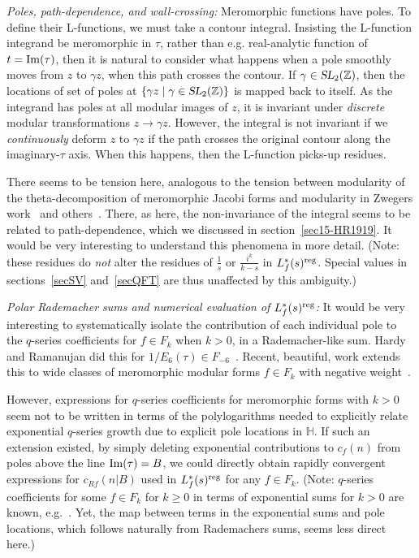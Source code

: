 \documentclass[11pt,a4paper]{article}
\newcommand{\g}{\gamma}
\def\Z{\mathbb{Z}}
\newcommand{\SL}{\operatorname{\textsl{SL}}}	 	%
\newcommand{\HH}{{\mathbb H}}				%
\newcommand{\reg}{{\rm reg}}
\begin{document}
{\em Poles, path-dependence, and wall-crossing:} Meromorphic functions have poles. To define their L-functions, we must take a contour integral. Insisting the L-function integrand be meromorphic in $\tau$, rather than e.g. real-analytic function of $t = {\rm Im}(\tau)$, then it is natural to consider what happens when a pole smoothly moves from $z$ to $\g z$, when this path crosses the contour. If $\g \in \SL_2(\Z)$, then the locations of set of poles at $\{\g z \mid \g \in \SL_2(\Z)\}$ is mapped back to itself. As the integrand has poles at all modular images of $z$, it is invariant under {\em discrete} modular transformations $z \to \g z$. However, the integral is not invariant if we {\em continuously} deform $z$ to $\g z$ if the path crosses the original contour along the imaginary-$\tau$ axis. When this happens, then the L-function picks-up residues. 

There seems to be tension here, analogous to the tension between modularity of the theta-decomposition of meromorphic Jacobi forms and modularity in Zwegers work~\cite{23-Zwegers} and others~\cite{24-DMZ}. There, as here, the non-invariance of the integral seems to be related to path-dependence, which we discussed in section~\ref{sec15-HR1919}. It would be very interesting to understand this phenomena in more detail. (Note: these residues do {\em not} alter the residues of $\tfrac1s$ or $\tfrac{i^k}{k-s}$ in $L_f^*(s)^\reg$. Special values in sections~\ref{secSV} and~\ref{secQFT} are thus unaffected by this ambiguity.)

{\em Polar Rademacher sums and numerical evaluation of $L_f^*(s)^\reg$:} It would be very interesting to systematically isolate the contribution of each individual pole to the $q$-series coefficients for $f \in F_k$ when $k > 0$, in a Rademacher-like sum. Hardy and Ramanujan did this for $1/E_6(\tau) \in F_{-6}$~\cite{15-HR1919}. Recent, beautiful, work extends this to wide classes of meromorphic modular forms $f \in F_{k}$ with negative weight~\cite{16-BialekPol1, 17-BialekPol2, 18-BialekPol3, 19-KolnPol1, 20-KolnPol2}. 

However, expressions for $q$-series coefficients for meromorphic forms with $k > 0$ seem not to be written in terms of the polylogarithms needed to explicitly relate exponential $q$-series growth due to explicit pole locations in $\HH$. If such an extension existed, by simply deleting exponential contributions to $c_f(n)$ from poles above the line ${\rm Im}(\tau) = B$, we could directly obtain rapidly convergent expressions for $c_{Rf}(n|B)$ used in $L_f^*(s)^\reg$ for any $f \in F_k$. (Note: $q$-series coefficients for some $f \in F_k$ for $k \geq 0$ in terms of exponential sums for $k > 0$ are known, e.g.~\cite{34-Duke-pole, 35-KolnPol3}. Yet, the map between terms in the exponential sums and pole locations, which follows naturally from Rademachers sums, seems less direct here.) 
\end{document}
